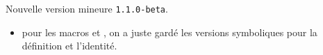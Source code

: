 Nouvelle version mineure \verb+1.1.0-beta+.

\begin{itemize}[itemsep=.5em]
    \item {}
          pour les macros  et , on a juste gardé les versions symboliques pour la définition et l'identité.
\end{itemize}


\separation

